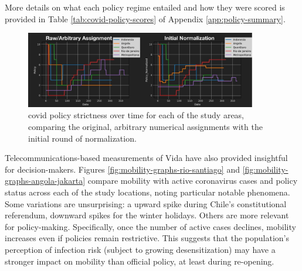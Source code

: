 More details on what each policy regime entailed and how they were scored is provided in Table \ref{tab:covid-policy-scores} of Appendix \ref{app:policy-summary}. 

\begin{figure}[!htb]
\centering
\includegraphics[width=0.9\textwidth]{Figures/chap5/policy-comparison.png}
\caption[COVID-19 Policy Strictness Over Time]{\ac{covid} policy strictness over time for each of the study areas, comparing the original, arbitrary numerical assignments with the initial round of normalization.}
\label{fig:policy-comparison}
\end{figure}

Telecommunications-based measurements of Vida have also provided insightful for decision-makers. Figures \ref{fig:mobility-graphs-rio-santiago} and \ref{fig:mobility-graphs-angola-jakarta} compare mobility with active coronavirus cases and policy status across each of the study locations, noting particular notable phenomena. Some variations are unsurprising: a upward spike during Chile's constitutional referendum, downward spikes for the winter holidays. Others are more relevant for policy-making. Specifically, once the number of active cases declines, mobility increases even if policies remain restrictive. This suggests that the population's perception of infection risk (subject to growing desensitization) may have a stronger impact on mobility than official policy, at least during re-opening.

\clearpage

